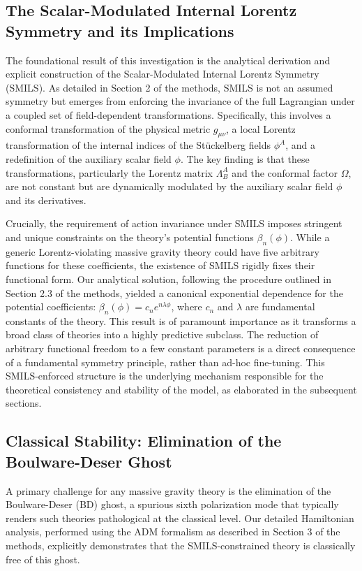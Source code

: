 \documentclass[twocolumn]{aastex631}
\begin{document}
\subsection{The Scalar-Modulated Internal Lorentz Symmetry and its Implications}
The foundational result of this investigation is the analytical derivation and explicit construction of the Scalar-Modulated Internal Lorentz Symmetry (SMILS). As detailed in Section 2 of the methods, SMILS is not an assumed symmetry but emerges from enforcing the invariance of the full Lagrangian under a coupled set of field-dependent transformations. Specifically, this involves a conformal transformation of the physical metric $g_{\mu\nu}$, a local Lorentz transformation of the internal indices of the Stückelberg fields $\phi^A$, and a redefinition of the auxiliary scalar field $\phi$. The key finding is that these transformations, particularly the Lorentz matrix $\Lambda^A_B$ and the conformal factor $\Omega$, are not constant but are dynamically modulated by the auxiliary scalar field $\phi$ and its derivatives.

Crucially, the requirement of action invariance under SMILS imposes stringent and unique constraints on the theory's potential functions $\beta_n(\phi)$. While a generic Lorentz-violating massive gravity theory could have five arbitrary functions for these coefficients, the existence of SMILS rigidly fixes their functional form. Our analytical solution, following the procedure outlined in Section 2.3 of the methods, yielded a canonical exponential dependence for the potential coefficients: $\beta_n(\phi) = c_n e^{n\lambda\phi}$, where $c_n$ and $\lambda$ are fundamental constants of the theory. This result is of paramount importance as it transforms a broad class of theories into a highly predictive subclass. The reduction of arbitrary functional freedom to a few constant parameters is a direct consequence of a fundamental symmetry principle, rather than ad-hoc fine-tuning. This SMILS-enforced structure is the underlying mechanism responsible for the theoretical consistency and stability of the model, as elaborated in the subsequent sections.

\subsection{Classical Stability: Elimination of the Boulware-Deser Ghost}
A primary challenge for any massive gravity theory is the elimination of the Boulware-Deser (BD) ghost, a spurious sixth polarization mode that typically renders such theories pathological at the classical level. Our detailed Hamiltonian analysis, performed using the ADM formalism as described in Section 3 of the methods, explicitly demonstrates that the SMILS-constrained theory is classically free of this ghost.
\end{document}
